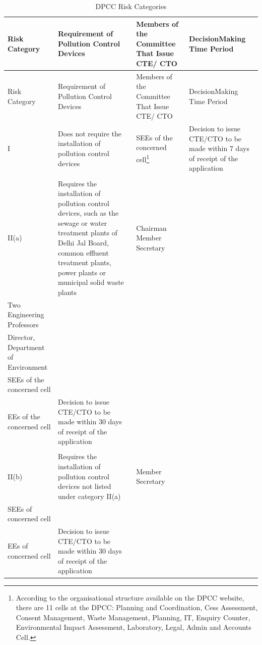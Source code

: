 \documentclass[a4paper, 12pt]{article}
\newcommand\tabitem{\makebox[1em][r]{\textbullet~}}
\begin{document}

\begin{longtable}{>{\raggedright}p{2cm}>{\raggedright}p{4cm}>{\raggedright}p{4cm}>{\raggedright\arraybackslash}p{4cm}}
\caption{DPCC Risk Categories} \\
Risk Category & Requirement of Pollution Control Devices & Members of the Committee That Issue CTE/ CTO & DecisionMaking Time Period \\
\midrule
\endfirsthead
Risk Category & Requirement of Pollution Control Devices & Members of the Committee That Issue CTE/ CTO & DecisionMaking Time Period \\
\midrule
\endhead
\endfoot
\endlastfoot

I & Does not require the installation of pollution control devices & SEEs of the concerned cell\footnote{According to the organisational structure available on the DPCC website, there are 11 cells at the DPCC: Planning and Coordination, Cess Assessment, Consent Management, Waste Management, Planning, IT, Enquiry Counter, Environmental Impact Assessment, Laboratory, Legal, Admin and Accounts Cell.} & Decision to issue CTE/CTO to be made within 7 days of receipt of the application \\
 & & &  \\
II(a) & Requires the installation of pollution control devices, such as the sewage or water treatment plants of Delhi Jal Board, common effluent treatment plants, power plants or municipal solid waste plants & \tabitem Chairman  \tabitem Member Secretary \\  \tabitem Two Engineering Professors \\ \tabitem Director, Department of Environment \\ \tabitem SEEs of the concerned cell \\ \tabitem EEs of the concerned cell 
 & Decision to issue CTE/CTO to be made within 30 days of receipt of the application \\
  & & & \\
II(b) & Requires the installation of pollution control devices not listed under category II(a) & \tabitem Member Secretary \\ \tabitem SEEs of concerned cell \\ \tabitem  EEs of concerned cell & Decision to issue CTE/CTO to be made within 30 days of receipt of the application \\

\end{longtable}
         
\end{document}
